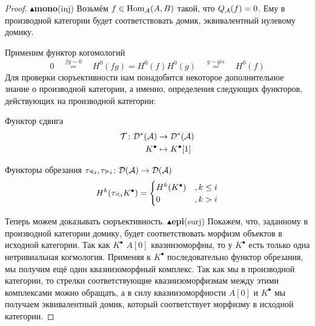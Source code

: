 \documentclass[../main.tex]{subfiles}
\begin{document}
\begin{proof}
$\blacktriangle$\textbf{mono}(inj)
Возьмём $f \in \operatorname{Hom}_{\mathcal{A}}(A, B)$ такой, что $Q_{\mathcal{A}}(f) = 0$. Ему в производной категории будет соответствовать домик, эквивалентный нулевому домику. 
\bee
{} 
\qquad
{} 
\eee
Применим функтор когомологий 
\[
0\quad \overset{fg\sim0}{=}\quad H^0 (fg) = H^0(f) H^0(g)\quad \overset{g-qis}{=}\quad H^0(f) 
\]
Для проверки сюръективности нам понадобится некоторое дополнительное знание о производной категории, а именно, определения следующих функторов, действующих на производной категории:
\begin{to_def}
Функтор сдвига
\begin{align*}
\mathcal{T}\colon \mathcal{D^{*}(A)}& \to \mathcal{D^{*}(A)}\\
 K^\bullet& \mapsto K^\bullet[1]
\end{align*}
\end{to_def}
\begin{to_def}
Функторы обрезания $\tau_{ \curlyeqprec i}, \tau_{ \curlyeqsucc i} \colon \mathcal{D(A)} \to \mathcal{D(A)}$
\[
H^k(\tau_{ \curlyeqprec i} K^\bullet) = \begin{cases}H^k(K^\bullet) &, k \le i \\ 0 &, k>i \end{cases}
\]
\bee
{}
\qquad
{}
\eee
\end{to_def}
Теперь можем доказывать сюръективность.
$\blacktriangle$\textbf{epi}(surj) Покажем, что, заданному в производной категории домику, будет соответствовать морфизм объектов в исходной категории. Так как $K^\bullet$ $A[0]$ квазиизоморфны, то у $K^\bullet$ есть только одна нетривиальная когмология. Применяя к $K^\bullet$ последовательно функтор обрезания, мы получим ещё один квазиизоморфный комплекс. Так как мы в производной категории, то стрелки соответствующие квазиизоморфизмам между этими комплексами можно обращать, а в силу квазиизоморфности $A[0]$ и $K^\bullet$ мы получаем эквивалентный домик, который соответствует морфизму в исходной категории.

\end{proof}
\end{document}
